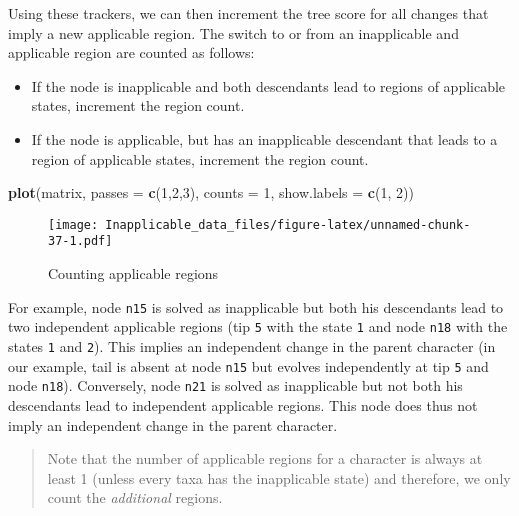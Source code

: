 \documentclass[]{book}
\newenvironment{Shaded}{\begin{snugshade}}{\end{snugshade}}
\newcommand{\KeywordTok}[1]{\textcolor[rgb]{0.13,0.29,0.53}{\textbf{#1}}}
\newcommand{\DataTypeTok}[1]{\textcolor[rgb]{0.13,0.29,0.53}{#1}}
\newcommand{\DecValTok}[1]{\textcolor[rgb]{0.00,0.00,0.81}{#1}}
\newcommand{\NormalTok}[1]{#1}
\providecommand{\tightlist}{%
  \setlength{\itemsep}{0pt}\setlength{\parskip}{0pt}}
\theoremstyle{definition}
\theoremstyle{definition}
\theoremstyle{definition}
\theoremstyle{remark}
\begin{document}
Using these trackers, we can then increment the tree score for all
changes that imply a new applicable region. The switch to or from an
inapplicable and applicable region are counted as follows:

\begin{itemize}
\tightlist
\item
  If the node is inapplicable and both descendants lead to regions of
  applicable states, increment the region count.
\item
  If the node is applicable, but has an inapplicable descendant that
  leads to a region of applicable states, increment the region count.
\end{itemize}

\begin{Shaded}
\begin{Highlighting}[]
\KeywordTok{plot}\NormalTok{(matrix, }\DataTypeTok{passes =} \KeywordTok{c}\NormalTok{(}\DecValTok{1}\NormalTok{,}\DecValTok{2}\NormalTok{,}\DecValTok{3}\NormalTok{), }\DataTypeTok{counts =} \DecValTok{1}\NormalTok{, }\DataTypeTok{show.labels =} \KeywordTok{c}\NormalTok{(}\DecValTok{1}\NormalTok{, }\DecValTok{2}\NormalTok{))}
\end{Highlighting}
\end{Shaded}

\begin{figure}
\centering
\texttt{[image: Inapplicable\_data\_files/figure-latex/unnamed-chunk-37-1.pdf]}
\caption{\label{fig:unnamed-chunk-37}Counting applicable regions}
\end{figure}

For example, node \texttt{n15} is solved as inapplicable but both his
descendants lead to two independent applicable regions (tip \texttt{5}
with the state \texttt{1} and node \texttt{n18} with the states
\texttt{1} and \texttt{2}). This implies an independent change in the
parent character (in our example, tail is absent at node \texttt{n15}
but evolves independently at tip \texttt{5} and node \texttt{n18}).
Conversely, node \texttt{n21} is solved as inapplicable but not both his
descendants lead to independent applicable regions. This node does thus
not imply an independent change in the parent character.

\begin{quote}
Note that the number of applicable regions for a character is always at
least 1 (unless every taxa has the inapplicable state) and therefore, we
only count the \emph{additional} regions.
\end{quote}
\end{document}
